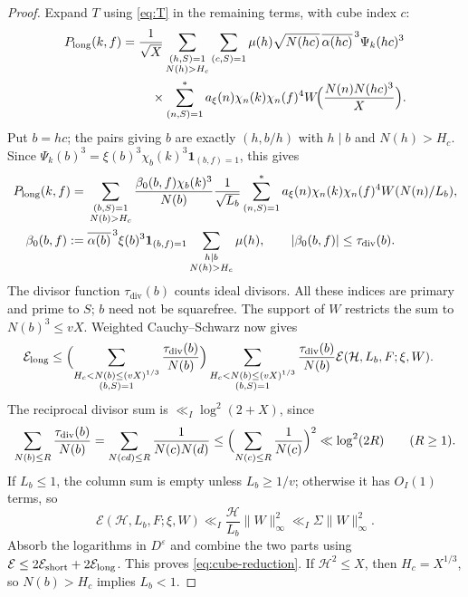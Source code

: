 \documentclass[11pt,a4paper]{article}
\numberwithin{equation}{section}
\numberwithin{figure}{section}
\theoremstyle{definition}
\theoremstyle{remark}
\newcommand{\E}{\mathcal E}
\newcommand{\ind}{\mathbf1}
\begin{document}
\begin{proof}
Expand $T$ using \eqref{eq:T} in the remaining terms, with cube index $c$:
\[
 \begin{aligned}
 P_{\rm long}(k,f)
 ={}&\frac1{\sqrt X}
 \sum_{\substack{(h,S)=1\\N(h)>H_c}}\sum_{(c,S)=1}
 \mu(h)\sqrt{N(hc)}\,\overline{\alpha(hc)}^{\,3}\Psi_k(hc)^3\\
 &\quad\times\sum_{(n,S)=1}^*a_\xi(n)\chi_n(k)\chi_n(f)^4
 W\!\Bigl(\frac{N(n)N(hc)^3}{X}\Bigr).
 \end{aligned}
\]
Put $b=hc$; the pairs giving $b$ are exactly $(h,b/h)$ with
$h\mid b$ and $N(h)>H_c$. Since
$\Psi_k(b)^3=\xi(b)^3\chi_b(k)^3\ind_{(b,f)=1}$, this gives
\[
 \begin{aligned}
 P_{\rm long}(k,f)
 ={}&\sum_{\substack{(b,S)=1\\N(b)>H_c}}
 \frac{\beta_0(b,f)\chi_b(k)^3}{N(b)}
 \frac1{\sqrt{L_b}}
 \sum_{(n,S)=1}^*a_\xi(n)\chi_n(k)\chi_n(f)^4
 W(N(n)/L_b),\\
 \beta_0(b,f):={}&\overline{\alpha(b)}^{\,3}\xi(b)^3
 \ind_{(b,f)=1}\sum_{\substack{h\mid b\\N(h)>H_c}}\mu(h),
 \qquad |\beta_0(b,f)|\le\tau_{\mathrm{div}}(b).
 \end{aligned}
\]
The divisor function $\tau_{\mathrm{div}}(b)$ counts ideal divisors.
All these indices are primary and prime to $S$; $b$ need not be
squarefree. The support of $W$ restricts the sum to $N(b)^3\le vX$.
Weighted Cauchy--Schwarz now gives
\[
 \begin{aligned}
 \E_{\rm long}
 &\le\Bigl(\sum_{\substack{H_c<N(b)\le(vX)^{1/3}\\(b,S)=1}}
             \frac{\tau_{\mathrm{div}}(b)}{N(b)}\Bigr)
       \sum_{\substack{H_c<N(b)\le(vX)^{1/3}\\(b,S)=1}}
             \frac{\tau_{\mathrm{div}}(b)}{N(b)}
             \E(\mathcal H,L_b,F;\xi,W).
 \end{aligned}
\]
The reciprocal divisor sum is $\ll_I\log^2(2+X)$, since
\[
 \sum_{N(b)\le R}\frac{\tau_{\mathrm{div}}(b)}{N(b)}
 =\sum_{N(cd)\le R}\frac1{N(c)N(d)}
 \le\Bigl(\sum_{N(c)\le R}\frac1{N(c)}\Bigr)^2
 \ll\log^2(2R)\qquad(R\ge1).
\]
If $L_b\le1$, the column sum is empty unless $L_b\ge1/v$;
otherwise it has $O_I(1)$ terms, so
\[
 \E(\mathcal H,L_b,F;\xi,W)
 \ll_I\frac{\mathcal H}{L_b}\|W\|_\infty^2
 \ll_I\Sigma\|W\|_\infty^2.
\]
Absorb the logarithms in $D^\varepsilon$ and combine the two parts
using $\E\le2\E_{\rm short}+2\E_{\rm long}$.
This proves \eqref{eq:cube-reduction}. If $\mathcal H^2\le X$,
then $H_c=X^{1/3}$, so $N(b)>H_c$ implies $L_b<1$.
\end{proof}
\end{document}
